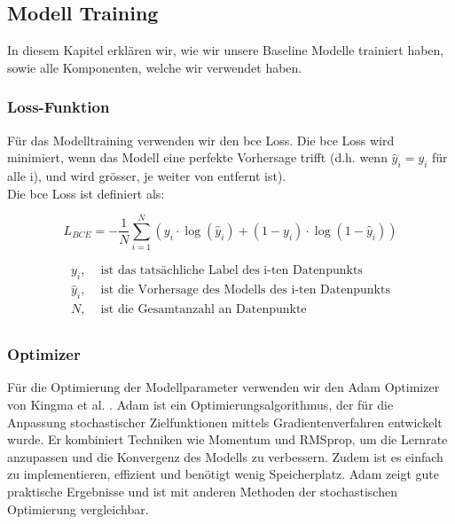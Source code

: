 \subsection{Modell Training}


\label{chap:baselinetraining}
In diesem Kapitel erklären wir, wie wir unsere Baseline Modelle trainiert haben, sowie alle Komponenten, welche wir verwendet haben.

\subsubsection{Loss-Funktion} \label{chap:loss-function}
Für das Modelltraining verwenden wir den \acrlong{bce} Loss. Die \acrshort{bce} Loss wird minimiert, wenn das Modell eine perfekte Vorhersage trifft (d.h. wenn $\hat{y}_i = y_i$ für alle i), und wird grösser, je weiter von entfernt ist).  \\
Die \acrshort{bce} Loss ist definiert als:

\begin{equation}
    L_{BCE} = -\frac{1}{N} \sum_{i=1}^{N} (y_i \cdot \log(\hat{y}_i) + (1-y_i) \cdot \log(1-\hat{y}_i))
    \label{eq:TrainingBCE}
\end{equation}

\begin{align*}
y_i,        &\text{ ist das tatsächliche Label des i-ten Datenpunkts} \\
\hat{y}_i,  &\text{ ist die Vorhersage des Modells des i-ten Datenpunkts} \\
N,          &\text{ ist die Gesamtanzahl an Datenpunkte} \\
\end{align*} 

\subsubsection{Optimizer} \label{chap:optimizer}
Für die Optimierung der Modellparameter verwenden wir den Adam Optimizer von Kingma et al. \cite{kingma_adam_2017}. 
Adam ist ein Optimierungsalgorithmus, der für die Anpassung stochastischer Zielfunktionen mittels Gradientenverfahren entwickelt wurde. Er kombiniert Techniken wie Momentum und RMSprop, um die Lernrate anzupassen und die Konvergenz des Modells zu verbessern. Zudem ist es einfach zu implementieren, effizient und benötigt wenig Speicherplatz. Adam zeigt gute praktische Ergebnisse und ist mit anderen Methoden der stochastischen Optimierung vergleichbar. 

